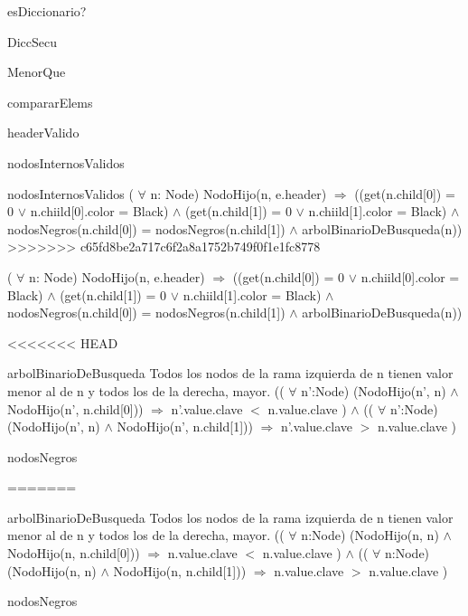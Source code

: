 \begin{DoxyParagraph}{es\-Diccionario?}
\begin{DoxyParagraph}{\-Dicc\-Secu}
\begin{DoxyParagraph}{\-Menor\-Que}
\begin{DoxyParagraph}{comparar\-Elems}
\begin{DoxyParagraph}{header\-Valido}
\begin{DoxyParagraph}{nodos\-Internos\-Validos}
\begin{DoxyParagraph}{nodos\+Internos\+Validos}
( $\forall$ n\+: Node) Nodo\+Hijo(n, e.\+header) $\Rightarrow$ ((get(n.\+child\mbox{[}0\mbox{]}) = 0 $\lor$ n.\+chiild\mbox{[}0\mbox{]}.color = Black) $\land$ (get(n.\+child\mbox{[}1\mbox{]}) = 0 $\lor$ n.\+chiild\mbox{[}1\mbox{]}.color = Black) $\land$ nodos\+Negros(n.\+child\mbox{[}0\mbox{]}) = nodos\+Negros(n.\+child\mbox{[}1\mbox{]}) $\land$ arbol\+Binario\+De\+Busqueda(n)) 
>>>>>>> c65fd8be2a717c6f2a8a1752b749f0f1e1fc8778
\end{DoxyParagraph}
( $\forall$ n\-: \-Node) \-Nodo\-Hijo(n, e.\-header) $\Rightarrow$ ((get(n.\-child\mbox{[}0\mbox{]}) = 0 $\lor$ n.\-chiild\mbox{[}0\mbox{]}.color = \-Black) $\land$ (get(n.\-child\mbox{[}1\mbox{]}) = 0 $\lor$ n.\-chiild\mbox{[}1\mbox{]}.color = \-Black) $\land$ nodos\-Negros(n.\-child\mbox{[}0\mbox{]}) = nodos\-Negros(n.\-child\mbox{[}1\mbox{]}) $\land$ arbol\-Binario\-De\-Busqueda(n)) 

<<<<<<< HEAD
\begin{DoxyParagraph}{arbol\-Binario\-De\-Busqueda}
\-Todos los nodos de la rama izquierda de n tienen valor menor al de n y todos los de la derecha, mayor. (( $\forall$ n'\-:\-Node) (\-Nodo\-Hijo(n', n) $\land$ \-Nodo\-Hijo(n', n.\-child\mbox{[}0\mbox{]})) $\Rightarrow$ n'.value.\-clave $<$ n.\-value.\-clave ) $\land$ (( $\forall$ n'\-:\-Node) (\-Nodo\-Hijo(n', n) $\land$ \-Nodo\-Hijo(n', n.\-child\mbox{[}1\mbox{]})) $\Rightarrow$ n'.value.\-clave $>$ n.\-value.\-clave ) 
\end{DoxyParagraph}
\begin{DoxyParagraph}{nodos\-Negros}

=======

\begin{DoxyParagraph}{arbol\+Binario\+De\+Busqueda}
Todos los nodos de la rama izquierda de n tienen valor menor al de n y todos los de la derecha, mayor. (( $\forall$ n\textquotesingle{}\+:Node) (Nodo\+Hijo(n\textquotesingle{}, n) $\land$ Nodo\+Hijo(n\textquotesingle{}, n.\+child\mbox{[}0\mbox{]})) $\Rightarrow$ n\textquotesingle{}.value.\+clave $<$ n.\+value.\+clave ) $\land$ (( $\forall$ n\textquotesingle{}\+:Node) (Nodo\+Hijo(n\textquotesingle{}, n) $\land$ Nodo\+Hijo(n\textquotesingle{}, n.\+child\mbox{[}1\mbox{]})) $\Rightarrow$ n\textquotesingle{}.value.\+clave $>$ n.\+value.\+clave ) 
\end{DoxyParagraph}


\begin{DoxyParagraph}{nodos\+Negros}



\end{DoxyParagraph}
\end{DoxyParagraph}
\end{DoxyParagraph}
\end{DoxyParagraph}
\end{DoxyParagraph}
\end{DoxyParagraph}
\end{DoxyParagraph}
\end{DoxyParagraph}
